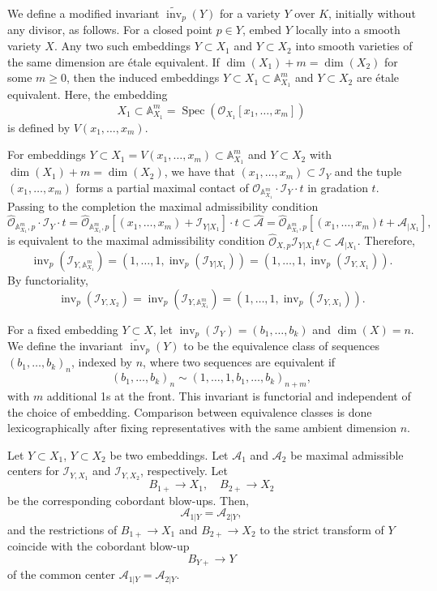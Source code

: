 \documentclass{amsart}
\newcommand{\cA}{{\mathcal A}}
\newcommand{\cI}{{\mathcal I}}
\newcommand{\cO}{{\mathcal O}}
\newcommand{\Spec}{\operatorname{Spec}}
\newcommand{\inv}{{\operatorname{inv}}}
\begin{document}
We define a modified invariant \( \widetilde{\inv}_p(Y) \) for a variety \( Y \) over \( K \), initially without any divisor, as follows. For a closed point \( p \in Y \), embed \( Y \) locally into a smooth variety \( X \). Any two such embeddings \( Y \subset X_1 \) and \( Y \subset X_2 \) into smooth varieties of the same dimension are \'etale equivalent. If \( \dim(X_1) + m = \dim(X_2) \) for some \( m \geq 0 \), then the induced embeddings \( Y \subset X_1 \subset \mathbb{A}^m_{X_1} \) and \( Y \subset X_2 \) are \'etale equivalent. Here, the embedding
\[
X_1 \subset \mathbb{A}^m_{X_1} = \Spec(\mathcal{O}_{X_1}[x_1, \ldots, x_m])
\]
is defined by \( V(x_1, \ldots, x_m) \).

For embeddings \( Y \subset X_1 = V(x_1, \ldots, x_m) \subset \mathbb{A}^m_{X_1} \) and \( Y \subset X_2 \)  with \( \dim(X_1) + m = \dim(X_2) \), we have that  $(x_1, \ldots, x_m)\subset \cI_Y$ and the tuple \( (x_1, \ldots, x_m) \) forms a partial maximal contact of $\cO_{\mathbb{A}^m_{X_1}}\cdot \cI_Y\cdot  t$ in gradation \( t \). Passing to the completion
 the maximal admissibility condition
\[
\widehat{\mathcal{O}}_{\mathbb{A}^m_{X_1},p} \cdot \cI_Y\cdot t = \widehat{\mathcal{O}}_{\mathbb{A}^m_{X_1},p}[(x_1, \ldots, x_m)+ \cI_{Y|X_1}]\cdot t \subset \widehat{\cA}= \widehat{\mathcal{O}}_{\mathbb{A}^m_{X_1},p} [(x_1, \ldots, x_m)t+\cA_{|X_1}],
\]
 is equivalent to the maximal admissibility condition \( \widehat{\mathcal{O}}_{X,p}\cI_{Y|X_1}t \subset \mathcal{A}_{|X_1} \). Therefore,
\[
\inv_p(\cI_{Y,\mathbb{A}^m_{X_1}}) = (1, \ldots, 1, \inv_p(\cI_{Y|X_1})) = (1, \ldots, 1, \inv_p(\mathcal{I}_{Y,X_1})).
\]
By functoriality,
\[
\inv_p(\mathcal{I}_{Y,X_2}) = \inv_p(\mathcal{I}_{Y,\mathbb{A}^m_{X_1}}) = (1, \ldots, 1, \inv_p(\mathcal{I}_{Y,X_1})).
\]

For a fixed embedding \( Y \subset X \), let \( \inv_p(\mathcal{I}_Y) = (b_1, \ldots, b_k) \) and \( \dim(X) = n \). We define the invariant \( \widetilde{\inv}_p(Y) \) to be the equivalence class of sequences \( (b_1, \ldots, b_k)_n \), indexed by $n$, where two sequences are equivalent if
\[
(b_1, \ldots, b_k)_n \sim (1, \ldots, 1, b_1, \ldots, b_k)_{n+m},
\]
with \( m \) additional 1s at the front. This invariant is functorial and independent of the choice of embedding. Comparison between equivalence classes is done lexicographically after fixing representatives with the same ambient dimension \( n \).

\begin{lemma}\label{compp}
Let \( Y \subset X_1 \), \( Y \subset X_2 \) be two embeddings. Let \( \mathcal{A}_1 \) and \( \mathcal{A}_2 \) be maximal admissible centers for \( \mathcal{I}_{Y,X_1} \) and \( \mathcal{I}_{Y,X_2} \), respectively. Let
\[
B_{1+} \to X_1, \quad B_{2+} \to X_2
\]
be the corresponding cobordant blow-ups. Then,
\[
\mathcal{A}_{1|Y} = \mathcal{A}_{2|Y},
\]
and the restrictions of \( B_{1+} \to X_1 \) and \( B_{2+} \to X_2 \) to the strict transform of \( Y \) coincide with the cobordant blow-up
\[
B_{Y+} \to Y
\]
of the common center \( \mathcal{A}_{1|Y} = \mathcal{A}_{2|Y} \).
\end{lemma}
\end{document}
